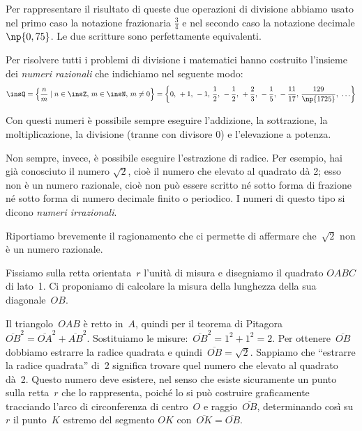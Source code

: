 Per rappresentare il risultato di queste due operazioni di divisione abbiamo usato nel primo caso la notazione frazionaria $\frac{3}{4}$ e nel secondo caso la notazione decimale $\np{0,75}$. Le due scritture sono perfettamente equivalenti.

Per risolvere tutti i problemi di divisione i matematici hanno costruito l'insieme dei \emph{numeri razionali} che indichiamo nel seguente modo:
\[
\insQ=\left\{\frac{n}{m} \mid n\in \insZ\text{, }m\in \insN\text{, }m\neq
0\right\}=\left\{0\text{, }+1\text{, }-1\text{, }\frac{1}{2}\text{, }-\frac{1}{2}\text{, }+\frac{2}{3}\text{, }-\frac{1}{5}\text{, }-\frac{11}{17}\text{, }\frac{129}{\np{1725}}\text{, }\ldots\right\}
\]

Con questi numeri è possibile sempre eseguire l'addizione, la sottrazione, la moltiplicazione, la divisione (tranne con divisore 0) e l'elevazione a potenza.

Non sempre, invece, è possibile eseguire l'estrazione di radice. Per esempio, hai già conosciuto il numero $\sqrt{2}$, cioè il numero che elevato al quadrato dà 2; esso non è un numero razionale, cioè non può essere scritto né sotto forma di frazione né sotto forma di numero decimale finito o periodico. I numeri di questo tipo si dicono \emph{numeri irrazionali}.

Riportiamo brevemente il ragionamento che ci permette di affermare che~$\sqrt{2}$ non è un numero razionale.

Fissiamo sulla retta orientata~$r$ l'unità di misura e disegniamo il quadrato $OABC$ di lato~1. Ci proponiamo di calcolare
la misura della lunghezza della sua diagonale~$OB$.

\begin{center}
 
\end{center}

Il triangolo~$OAB$ è retto in~$A$, quindi per il teorema di
Pitagora~$\overline{OB}^{2}=\overline{OA}^{2}+\overline{AB}^{2}$.
Sostituiamo le misure:~$\overline{OB}^{2}=1^2+1^2=2$. Per ottenere~$\overline{OB}$
dobbiamo estrarre la radice quadrata e quindi~$\overline{OB}=\sqrt{2}$.
Sappiamo che ``estrarre la radice quadrata'' di~2 significa trovare quel numero
che elevato al quadrato dà~2. Questo numero deve esistere, nel senso
che esiste sicuramente un punto sulla retta~$r$ che lo rappresenta, poiché lo si può costruire graficamente tracciando l'arco di
circonferenza di centro~$O$ e raggio~$\overline{OB}$, determinando così su $r$ il punto~$K$ estremo del segmento $OK$ con~$\overline{OK} = \overline{OB}$.

